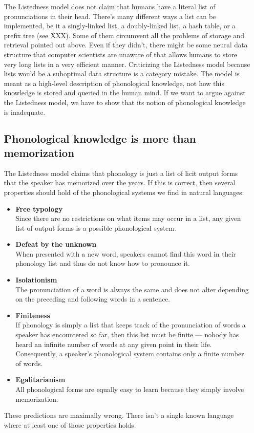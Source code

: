 The Listedness model does not claim that humans have a literal list of pronunciations in their head.
There's many different ways a list can be implemented, be it a singly-linked list, a doubly-linked list, a hash table, or a prefix tree (see XXX).
Some of them circumvent all the problems of storage and retrieval pointed out above.
Even if they didn't, there might be some neural data structure that computer scientists are unaware of that allows humans to store very long lists in a very efficient manner.
Criticizing the Listedness model because lists would be a suboptimal data structure is a category mistake.
The model is meant as a high-level description of phonological knowledge, not how this knowledge is stored and queried in the human mind.
If we want to argue against the Listedness model, we have to show that its notion of phonological knowledge is inadequate.

\subsection{Phonological knowledge is more than memorization}
\label{ssec:listphonology_inadequacy_knowledge}

The Listedness model claims that phonology is just a list of licit output forms that the speaker has memorized over the years.
If this is correct, then several properties should hold of the phonological systems we find in natural languages:
%
\begin{itemize}
    \item \textbf{Free typology}\\
        Since there are no restrictions on what items may occur in a list, any given list of output forms is a possible phonological system.
    \item \textbf{Defeat by the unknown}\\
        When presented with a new word, speakers cannot find this word in their phonology list and thus do not know how to pronounce it.
    \item \textbf{Isolationism}\\
        The pronunciation of a word is always the same and does not alter depending on the preceding and following words in a sentence.
    \item \textbf{Finiteness}\\
        If phonology is simply a list that keeps track of the pronunciation of words a speaker has encountered so far, then this list must be finite --- nobody has heard an infinite number of words at any given point in their life.
        Consequently, a speaker's phonological system contains only a finite number of words.
    \item \textbf{Egalitarianism}\\
        All phonological forms are equally easy to learn because they simply involve memorization.
\end{itemize}
%
These predictions are maximally wrong.
There isn't a single known language where at least one of those properties holds.

